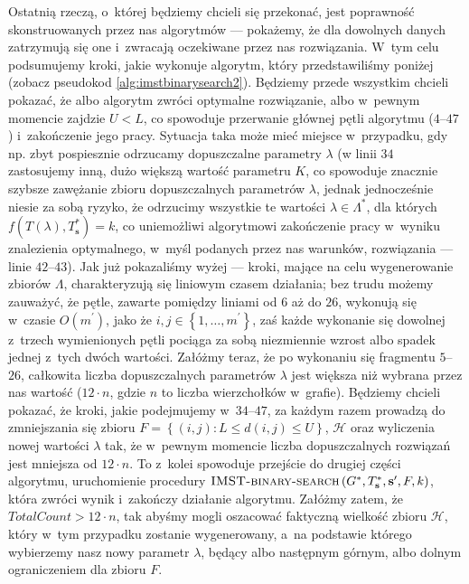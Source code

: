 Ostatnią rzeczą, o~której będziemy chcieli się przekonać, jest poprawność skonstruowanych przez nas algorytmów --- pokażemy, że dla dowolnych danych zatrzymują się one i~zwracają oczekiwane przez nas rozwiązania. W~tym celu podsumujemy kroki, jakie wykonuje algorytm, który przedstawiliśmy poniżej (zobacz pseudokod \ref{alg:imstbinarysearch2}). Będziemy przede wszystkim chcieli pokazać, że albo algorytm zwróci optymalne rozwiązanie, albo w~pewnym momencie zajdzie $U < L$, co spowoduje przerwanie głównej pętli algorytmu ($4$--$47$) i~zakończenie jego pracy. Sytuacja taka może mieć miejsce w~przypadku, gdy np. zbyt pospiesznie odrzucamy dopuszczalne parametry $\lambda$ (w linii $34$ zastosujemy inną, dużo większą wartość parametru $K$, co spowoduje znacznie szybsze zawężanie zbioru dopuszczalnych parametrów $\lambda$, jednak jednocześnie niesie za sobą ryzyko, że odrzucimy wszystkie te wartości $\lambda \in \Lambda^{\ast}$, dla których $f \left( T \left( \lambda \right), T^{\ast}_{\textbf{s}} \right) = k$, co uniemożliwi algorytmowi zakończenie pracy w~wyniku znalezienia optymalnego, w~myśl podanych przez nas warunków, rozwiązania --- linie $42$--$43$). Jak już pokazaliśmy wyżej --- kroki, mające na celu wygenerowanie zbiorów $\Lambda$, charakteryzują się liniowym czasem działania; bez trudu możemy zauważyć, że pętle, zawarte pomiędzy liniami od $6$ aż do $26$, wykonują się w~czasie $O \left( m^{\prime} \right)$, jako że $i, j \in \left\{ 1, \dots, m^{\prime} \right\}$, zaś każde wykonanie się dowolnej z~trzech wymienionych pętli pociąga za sobą niezmiennie wzrost albo spadek jednej z~tych dwóch wartości. Załóżmy teraz, że po wykonaniu się fragmentu $5$--$26$, całkowita liczba dopuszczalnych parametrów $\lambda$ jest większa niż wybrana przez nas wartość ($12 \cdot n$, gdzie $n$ to liczba wierzchołków w~grafie). Będziemy chcieli pokazać, że kroki, jakie podejmujemy w~$34$--$47$, za każdym razem prowadzą do zmniejszania się zbioru $F = \left\{ \left( i, j \right) : L \leqslant d \left( i, j \right) \leqslant U \right\}$, $\mathcal{H}$ oraz wyliczenia nowej wartości $\lambda$ tak, że w~pewnym momencie liczba dopuszczalnych rozwiązań jest mniejsza od $12 \cdot n$. To z~kolei spowoduje przejście do drugiej części algorytmu, uruchomienie procedury $\textsc{IMST-binary-search} \left( G^{\ast}, T^{\ast}_{\textbf{s}}, \textbf{s}^{\prime}, F, k \right)$, która zwróci wynik i~zakończy działanie algorytmu. Załóżmy zatem, że $TotalCount > 12 \cdot n$, tak abyśmy mogli oszacować faktyczną wielkość zbioru $\mathcal{H}$, który w~tym przypadku zostanie wygenerowany, a~na podstawie którego wybierzemy nasz nowy parametr $\lambda$, będący albo następnym górnym, albo dolnym ograniczeniem dla zbioru $F$.

